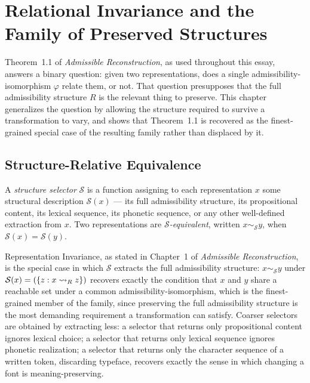 \chapter{Relational Invariance and the Family of Preserved Structures}
\label{ch:essay-relational-invariance}

Theorem~1.1 of \emph{Admissible Reconstruction}, as used throughout this essay, answers a binary question: given two representations, does a single admissibility-isomorphism $\varphi$ relate them, or not. That question presupposes that the full admissibility structure $R$ is the relevant thing to preserve. This chapter generalizes the question by allowing the structure required to survive a transformation to vary, and shows that Theorem~1.1 is recovered as the finest-grained special case of the resulting family rather than displaced by it.

\section{Structure-Relative Equivalence}

\begin{definition}
\label{def:structure-selector}
A \emph{structure selector} $\mathcal{S}$ is a function assigning to each representation $x$ some structural description $\mathcal{S}(x)$ --- its full admissibility structure, its propositional content, its lexical sequence, its phonetic sequence, or any other well-defined extraction from $x$. Two representations are \emph{$\mathcal{S}$-equivalent}, written $x \sim_{\mathcal{S}} y$, when $\mathcal{S}(x) = \mathcal{S}(y)$.
\end{definition}

Representation Invariance, as stated in Chapter~1 of \emph{Admissible Reconstruction}, is the special case in which $\mathcal{S}$ extracts the full admissibility structure: $x \sim_{\mathcal{S}} y$ under $\mathcal{S}(x) = (\{z : x \rightsquigarrow_{R} z\})$ recovers exactly the condition that $x$ and $y$ share a reachable set under a common admissibility-isomorphism, which is the finest-grained member of the family, since preserving the full admissibility structure is the most demanding requirement a transformation can satisfy. Coarser selectors are obtained by extracting less: a selector that returns only propositional content ignores lexical choice; a selector that returns only lexical sequence ignores phonetic realization; a selector that returns only the character sequence of a written token, discarding typeface, recovers exactly the sense in which changing a font is meaning-preserving.

